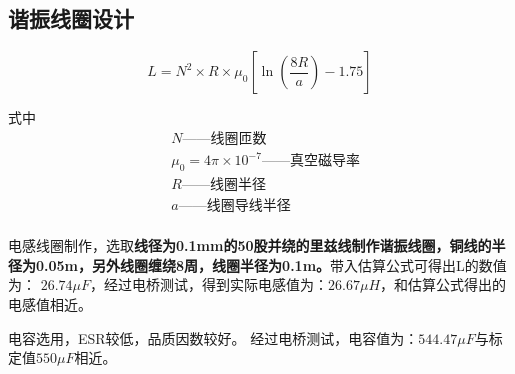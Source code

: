﻿\documentclass[UTF-8,12pt]{ctexart}
\def\red{\color{red}}
\begin{document}
    \subsection{谐振线圈设计}


            \begin{equation}
            L=N^2\times R \times \mu_0\left[\ln(\frac{8R}{a})-1.75\right]
            \label{L}
            \end{equation}

            式中\[\begin{split}
            &N\text{——线圈匝数} \\
            &\mu_0=4\pi \times 10^{-7}\text{——真空磁导率} \\
            &R\text{——线圈半径} \\
            &a\text{——线圈导线半径} \\
            \end{split}\]

            电感线圈制作，选取{\bf{线径为0.1mm的50股并绕的里兹线制作谐振线圈，铜线的半径为0.05m，另外线圈缠绕8周，线圈半径为0.1m。}}带入估算公式可得出L的数值为： $26.74\mu F$，经过电桥测试，得到实际电感值为：$26.67\mu H$，和估算公式得出的电感值相近。

            电容选用{\red{无极性同轴电容}}，ESR较低，品质因数较好。
            经过电桥测试，电容值为：$544.47\mu F$与标定值$550\mu F$相近。
\end{document}
